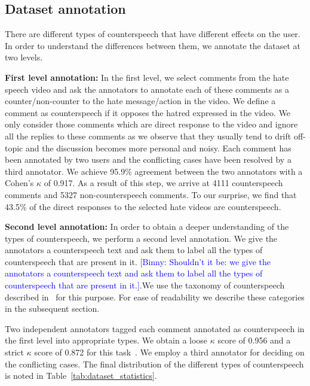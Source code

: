 \documentclass[11pt,a4paper]{article}
\newcommand{\binny}[1]{\textcolor{blue}{[Binny: #1]}}
\begin{document}
{{ 
\subsection{Dataset annotation}

There are different types of counterspeech that have different effects on the user. In order to understand the differences between them, we annotate the dataset at two levels. 

\noindent\textbf{First level annotation:} In the first level, we select comments from the hate speech video and ask the annotators to annotate each of these comments as a counter/non-counter to the hate message/action in the video. We define a comment as counterspeech if it opposes the hatred expressed in the video. We only consider those comments which are direct response to the video and ignore all the replies to these comments as we observe that they usually tend to drift off-topic and the discussion becomes more personal and noisy. Each comment has been annotated by two users and the conflicting cases have been resolved by a third annotator. We achieve 95.9\% agreement between the two annotators with a Cohen's $\kappa$ of 0.917. As a result of this step, we arrive at 4111 counterspeech comments and 5327 non-counterspeech comments. To our surprise, we find that 43.5\%  of the direct responses to the selected hate videos are counterspeech.

\noindent\textbf{Second level annotation:} In order to obtain a deeper understanding of the types of counterspeech, we perform a second level annotation. We give the annotators a counterspeech text and ask them to label all the types of counterspeech that are present in it. \binny{Shouldn't it be: we give the annotators a counterspeech text and ask them to label all the types of counterspeech that are present in it.}.\fi We use the taxonomy of counterspeech described in~\citet{susan2016counterspeech} for this purpose. For ease of readability we describe these categories in the subsequent section. 

Two independent annotators tagged each comment annotated as counterspeech in the first level into appropriate types. We obtain a loose $\kappa$ score of 0.956 and a strict $\kappa$ score of 0.872 for this task~\cite{ravenscroft2016multi}. We employ a third annotator for deciding on the conflicting cases. The final distribution of the different types of counterspeech is noted in Table~\ref{tab:dataset_statistics}.
 








}}
\end{document}
